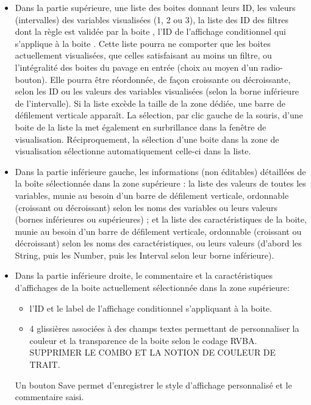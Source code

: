 \documentclass[a4paper]{article}
\begin{document}
\begin{itemize}
\item Dans la partie supérieure, une liste des boites donnant leurs ID, les valeurs (intervalles) des variables visualisées (1, 2 ou 3), la liste des ID des filtres dont la règle est validée par la boite \danger, l'ID de l'affichage conditionnel qui s'applique à la boite \danger. Cette liste pourra ne comporter que les boites actuellement visualisées, que celles satisfaisant au moins un filtre, ou l'intégralité des boites du pavage en entrée (choix au moyen d'un radio-bouton\danger). Elle pourra être réordonnée, de façon croissante ou décroissante, selon les ID ou les valeurs des variables visualisées (selon la borne inférieure de l'intervalle). Si la liste excède la taille de la zone dédiée, une barre de défilement verticale apparaît. La sélection, par clic gauche de la souris, d'une boite de la liste la met également en surbrillance dans la fenêtre de visualisation. Réciproquement, la sélection d'une boite dans la zone de visualisation sélectionne automatiquement celle-ci dans la liste.
\item Dans la partie inférieure gauche, les informations (non éditables) détaillées de la boîte sélectionnée dans la zone supérieure : la liste des valeurs de toutes les variables, munie au besoin d'un barre de défilement verticale, ordonnable (croissant ou décroissant) selon les noms des variables ou leurs valeurs (bornes inférieures ou supérieures) ; et la liste des caractéristiques de la boite, munie au besoin d'un barre de défilement verticale, ordonnable (croissant ou décroissant) selon les noms des caractéristiques, ou leurs valeurs (d'abord les String, puis les Number, puis les Interval selon leur borne inférieure).
\item Dans la partie inférieure droite, le commentaire et la caractéristiques d'affichages de la boite actuellement sélectionnée dans la zone supérieure:
  \begin{itemize}
  \item l'ID et le label de l'affichage conditionnel s'appliquant à la boite. \danger
  \item 4 glissières associées à des champs textes permettant de personnaliser la couleur et la transparence de la boite selon le codage RVBA.\\ SUPPRIMER LE COMBO ET LA NOTION DE COULEUR DE TRAIT.
  \end{itemize}
Un bouton Save permet d'enregistrer le style d'affichage personnalisé et le commentaire saisi.
\end{itemize}
\end{document}
